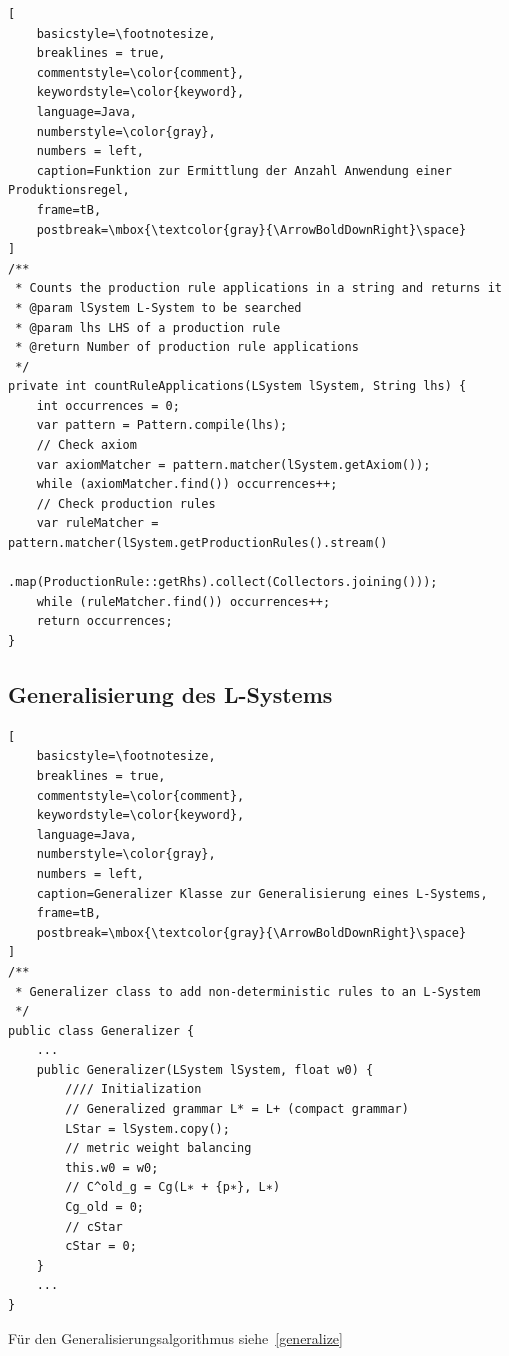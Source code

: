\begin{lstlisting}[
    basicstyle=\footnotesize,
    breaklines = true,
    commentstyle=\color{comment},
    keywordstyle=\color{keyword},
    language=Java,
    numberstyle=\color{gray},
    numbers = left,
    caption=Funktion zur Ermittlung der Anzahl Anwendung einer Produktionsregel,
    frame=tB,
    postbreak=\mbox{\textcolor{gray}{\ArrowBoldDownRight}\space}
]
/**
 * Counts the production rule applications in a string and returns it
 * @param lSystem L-System to be searched
 * @param lhs LHS of a production rule
 * @return Number of production rule applications
 */
private int countRuleApplications(LSystem lSystem, String lhs) {
    int occurrences = 0;
    var pattern = Pattern.compile(lhs);
    // Check axiom
    var axiomMatcher = pattern.matcher(lSystem.getAxiom());
    while (axiomMatcher.find()) occurrences++;
    // Check production rules
    var ruleMatcher = pattern.matcher(lSystem.getProductionRules().stream()
            .map(ProductionRule::getRhs).collect(Collectors.joining()));
    while (ruleMatcher.find()) occurrences++;
    return occurrences;
}
\end{lstlisting}

\subsection*{Generalisierung des L-Systems}
\begin{lstlisting}[
    basicstyle=\footnotesize,
    breaklines = true,
    commentstyle=\color{comment},
    keywordstyle=\color{keyword},
    language=Java,
    numberstyle=\color{gray},
    numbers = left,
    caption=Generalizer Klasse zur Generalisierung eines L-Systems,
    frame=tB,
    postbreak=\mbox{\textcolor{gray}{\ArrowBoldDownRight}\space}
]
/**
 * Generalizer class to add non-deterministic rules to an L-System
 */
public class Generalizer {
    ...
    public Generalizer(LSystem lSystem, float w0) {
        //// Initialization
        // Generalized grammar L* = L+ (compact grammar)
        LStar = lSystem.copy();
        // metric weight balancing
        this.w0 = w0;
        // C^old_g = Cg(L∗ + {p∗}, L∗)
        Cg_old = 0;
        // cStar
        cStar = 0;
    }
    ...
}
\end{lstlisting}

Für den Generalisierungsalgorithmus siehe~\ref{generalize}

